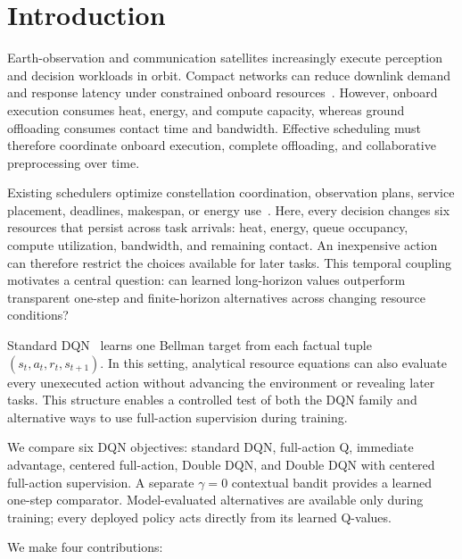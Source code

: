 \documentclass[11pt]{article}
\begin{document}
\section{Introduction}

Earth-observation and communication satellites increasingly execute perception and decision workloads in orbit. Compact networks can reduce downlink demand and response latency under constrained onboard resources~\cite{9925218,10107454,10378728,10440355,10423050}. However, onboard execution consumes heat, energy, and compute capacity, whereas ground offloading consumes contact time and bandwidth. Effective scheduling must therefore coordinate onboard execution, complete offloading, and collaborative preprocessing over time.

Existing schedulers optimize constellation coordination, observation plans, service placement, deadlines, makespan, or energy use~\cite{RN8,RN10,RN20,RN22,RN23,RN27,RN28}. Here, every decision changes six resources that persist across task arrivals: heat, energy, queue occupancy, compute utilization, bandwidth, and remaining contact. An inexpensive action can therefore restrict the choices available for later tasks. This temporal coupling motivates a central question: can learned long-horizon values outperform transparent one-step and finite-horizon alternatives across changing resource conditions?

Standard DQN~\cite{mnih2015human,watkins1992q} learns one Bellman target from each factual tuple $(s_t,a_t,r_t,s_{t+1})$. In this setting, analytical resource equations can also evaluate every unexecuted action without advancing the environment or revealing later tasks. This structure enables a controlled test of both the DQN family and alternative ways to use full-action supervision during training.

We compare six DQN objectives: standard DQN, full-action Q, immediate advantage, centered full-action, Double DQN, and Double DQN with centered full-action supervision. A separate $\gamma=0$ contextual bandit provides a learned one-step comparator. Model-evaluated alternatives are available only during training; every deployed policy acts directly from its learned Q-values.

We make four contributions:
\end{document}
